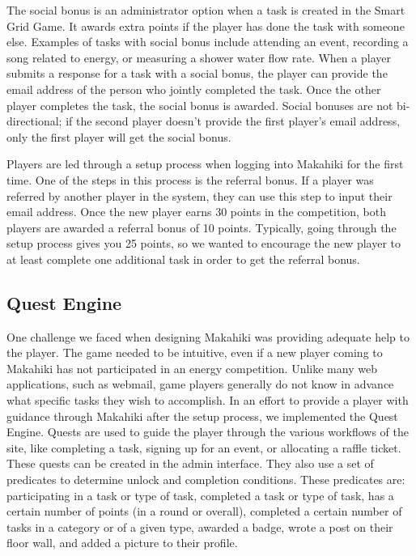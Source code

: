 The social bonus is an administrator option when a task is created in the Smart Grid Game. It awards extra points if the player has done the task with someone else. Examples of tasks with social bonus include attending an event, recording a song related to energy, or measuring a shower water flow rate. When a player submits a response for a task with a social bonus, the player can provide the email address of the person who jointly completed the task. Once the other player completes the task, the social bonus is awarded. Social bonuses are not bi-directional; if the second player doesn't provide the first player's email address, only the first player will get the social bonus.

Players are led through a setup process when logging into Makahiki for the first time. One of the steps in this process is the referral bonus. If a player was referred by another player in the system, they can use this step to input their email address. Once the new player earns 30 points in the competition, both players are awarded a referral bonus of 10 points. Typically, going through the setup process gives you 25 points, so we wanted to encourage the new player to at least complete one additional task in order to get the referral bonus.

\subsection{Quest Engine}

One challenge we faced when designing Makahiki was providing adequate help to the player. The game needed to be intuitive, even if a new player coming to Makahiki has not participated in an energy competition. Unlike many web applications, such as webmail, game players generally do not know in advance what specific tasks they wish to accomplish. In an effort to provide a player with guidance through Makahiki after the setup process, we implemented the Quest Engine. Quests are used to guide the player through the various workflows of the site, like completing a task, signing up for an event, or allocating a raffle ticket. These quests can be created in the admin interface. They also use a set of predicates to determine unlock and completion conditions. These predicates are: participating in a task or type of task, completed a task or type of task, has a certain number of points (in a round or overall), completed a certain number of tasks in a category or of a given type, awarded a badge, wrote a post on their floor wall, and added a picture to their profile.

